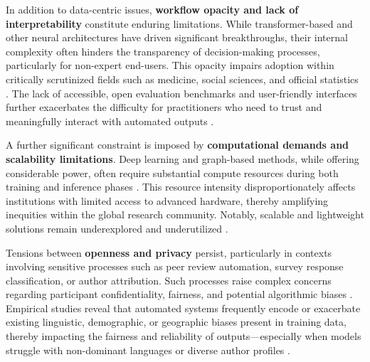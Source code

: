 In addition to data-centric issues, \textbf{workflow opacity and lack of interpretability} constitute enduring limitations. While transformer-based and other neural architectures have driven significant breakthroughs, their internal complexity often hinders the transparency of decision-making processes, particularly for non-expert end-users. This opacity impairs adoption within critically scrutinized fields such as medicine, social sciences, and official statistics \cite{ref61,ref62,ref64,ref70,ref84,ref86,ref88,ref90,ref91,ref92,ref93,ref94,ref95,ref104,ref105,ref108,ref110,ref112,ref114,ref117}. The lack of accessible, open evaluation benchmarks and user-friendly interfaces further exacerbates the difficulty for practitioners who need to trust and meaningfully interact with automated outputs \cite{ref63,ref64,ref68,ref70,ref73,ref78,ref80,ref86,ref87,ref88,ref89,ref90,ref91,ref92,ref93,ref95,ref96,ref97,ref100,ref103,ref104,ref105,ref108,ref109,ref110,ref111,ref112,ref113}.

A further significant constraint is imposed by \textbf{computational demands and scalability limitations}. Deep learning and graph-based methods, while offering considerable power, often require substantial compute resources during both training and inference phases \cite{ref41,ref61,ref62,ref63,ref64,ref68,ref70,ref76,ref78,ref80,ref81,ref82,ref84,ref86,ref87,ref88,ref89,ref90,ref91,ref92,ref93,ref94,ref95,ref99,ref100,ref109,ref110,ref111,ref113,ref114,ref115}. This resource intensity disproportionately affects institutions with limited access to advanced hardware, thereby amplifying inequities within the global research community. Notably, scalable and lightweight solutions remain underexplored and underutilized \cite{ref99,ref102,ref115}.

Tensions between \textbf{openness and privacy} persist, particularly in contexts involving sensitive processes such as peer review automation, survey response classification, or author attribution. Such processes raise complex concerns regarding participant confidentiality, fairness, and potential algorithmic biases \cite{ref73,ref76,ref81,ref85,ref92,ref94,ref97,ref98,ref106,ref110,ref113,ref114,ref115,ref117}. Empirical studies reveal that automated systems frequently encode or exacerbate existing linguistic, demographic, or geographic biases present in training data, thereby impacting the fairness and reliability of outputs—especially when models struggle with non-dominant languages or diverse author profiles \cite{ref61,ref74,ref90,ref92,ref94,ref95,ref104,ref105,ref110,ref112,ref113,ref114,ref115}.

